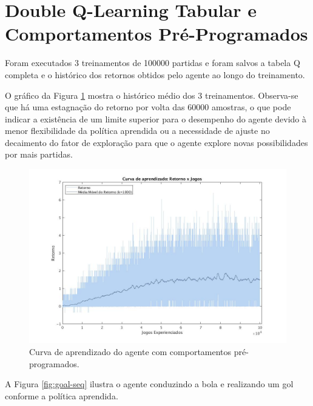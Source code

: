 \section{Double Q-Learning Tabular e Comportamentos Pré-Programados}

Foram executados 3 treinamentos de 100000 partidas e foram salvos a tabela Q completa e o histórico dos retornos obtidos pelo agente ao longo do treinamento.

O gráfico da Figura \ref{fig:single-agent-tabular-behaviors} mostra o histórico médio dos 3 treinamentos. Observa-se que
há uma estagnação do retorno por volta das 60000 amostras, o que pode indicar a existência de um limite superior para o desempenho do agente devido à menor flexibilidade da política aprendida ou a necessidade de ajuste no decaimento do fator de exploração para que o agente explore novas possibilidades por mais partidas.

\begin{figure}[H]
	\includegraphics[width=0.9\linewidth]{figs/curva-behaviors-tabular.jpg}
	\centering
	\caption{Curva de aprendizado do agente com comportamentos pré-programados.}
	\label{fig:single-agent-tabular-behaviors}
\end{figure}

A Figura \ref{fig:goal-seq} ilustra o agente conduzindo a bola e realizando um gol conforme a política aprendida.


